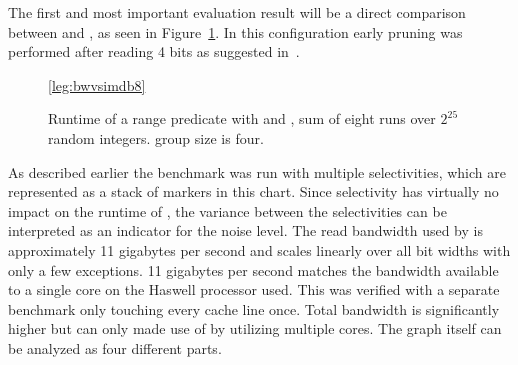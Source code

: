 The first and most important evaluation result will be a direct comparison
between \simdscan{} and \bwv{}, as seen in Figure~\ref{fig:eval:bwvsimdb8}. In
this configuration early pruning was performed after reading 4 bits as
suggested in~\cite{BitWeaving}.

\begin{figure}[h]
\pgfplotsset{footnotesize,width=0.75*\textwidth,height=6cm,compat=1.8}
\begin{center}

\ref*{leg:bwvsimdb8}
\end{center}
\caption{Runtime of a range predicate with \simdscan{} and \bwv{}, sum of eight
runs over $2^{25}$ random integers. \bwv{} group size is four.}
\label{fig:eval:bwvsimdb8}
\end{figure}

As described earlier the benchmark was run with multiple selectivities, which
are represented as a stack of markers in this chart. Since selectivity has
virtually no impact on the runtime of \simdscan{}, the variance between the
selectivities can be interpreted as an indicator for the noise level. The read
bandwidth used by \simdscan{} is approximately 11 gigabytes per second and
scales linearly over all bit widths with only a few exceptions. 11 gigabytes
per second matches the bandwidth available to a single core on the Haswell
processor used. This was verified with a separate benchmark only touching every
cache line once. Total bandwidth is significantly higher but can only made use
of by utilizing multiple cores. The graph itself can be analyzed as four
different parts.

